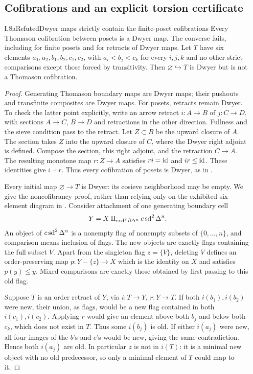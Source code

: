 \subsection{Cofibrations and an explicit torsion certificate}
\begin{claim}{I.8a}{Refuted}{Dwyer maps strictly contain the finite-poset cofibrations}
Every Thomason cofibration between posets is a Dwyer map. The converse
fails, including for finite posets and for retracts of Dwyer maps.
Let $T$ have six elements $a_1,a_2,b_1,b_2,c_1,c_2$, with
$a_i<b_j<c_k$ for every $i,j,k$ and no other strict comparisons except
those forced by transitivity. Then $\varnothing\hookrightarrow T$ is
Dwyer but is not a Thomason cofibration.
\end{claim}
\begin{proof}
Generating Thomason boundary maps are Dwyer maps; their pushouts and
transfinite composites are Dwyer maps. For posets, retracts remain
Dwyer. To check the latter point explicitly, write an arrow retract
$i:A\to B$ of $j:C\to D$, with sections $A\to C$, $B\to D$ and
retractions in the other direction. Fullness and the sieve condition
pass to the retract. Let $Z\subset B$ be the upward closure of $A$.
The section takes $Z$ into the upward closure of $C$, where the Dwyer
right adjoint is defined. Compose the section, this right adjoint,
and the retraction $C\to A$. The resulting monotone map $r:Z\to A$
satisfies $ri=\mathrm{id}$ and $ir\leq\mathrm{id}$. These identities give $i\dashv r$.
Thus every cofibration of posets is Dwyer, as in
\cite[Lemma~3.13]{I_MayStephanZakharevich2017}.

Every initial map $\varnothing\to T$ is Dwyer: its cosieve
neighborhood may be empty. We give the noncofibrancy proof, rather
than relying only on the exhibited six-element diagram in
\cite[Proposition~6.2]{I_MayStephanZakharevich2017}.
Consider attachment of one generating boundary cell
\[
 Y=X\amalg_{c\operatorname{sd}^2\partial\Delta^n}c\operatorname{sd}^2\Delta^n.
\]
An object of $c\operatorname{sd}^2\Delta^n$ is a nonempty flag of nonempty subsets
of $\{0,\ldots,n\}$, and comparison means inclusion of flags.
The new objects are exactly flags containing the full subset $V$.
Apart from the singleton flag $z=\{V\}$, deleting $V$ defines an
order-preserving map
$p:Y-\{z\}\to X$ which is the identity on $X$ and satisfies
$p(y)\leq y$. Mixed comparisons are exactly those obtained by first
passing to this old flag.

Suppose $T$ is an order retract of $Y$, via $i:T\to Y$, $r:Y\to T$.
If both $i(b_1),i(b_2)$ were new, their union, as flags, would be a
new flag contained in both $i(c_1),i(c_2)$. Applying $r$ would give
an element above both $b_j$ and below both $c_k$, which does not exist
in $T$. Thus some $i(b_j)$ is old. If either $i(a_j)$ were new, all
four images of the $b$'s and $c$'s would be new, giving the same
contradiction. Hence both $i(a_j)$ are old. In particular $z$ is not
in $i(T)$: it is a minimal new object with no old predecessor, so only
a minimal element of $T$ could map to it.


\end{proof}
